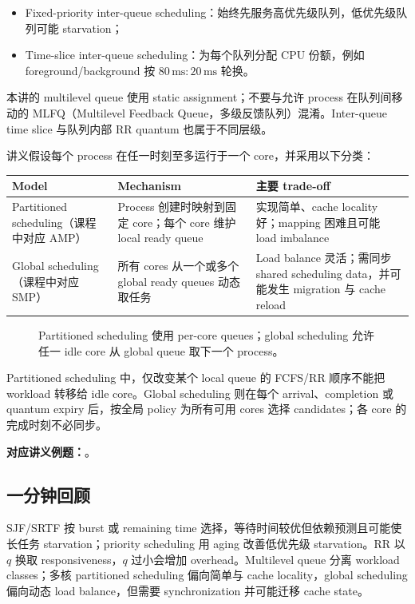 \begin{itemize}
  \item Fixed-priority inter-queue scheduling：始终先服务高优先级队列，低优先级队列可能 starvation；
  \item Time-slice inter-queue scheduling：为每个队列分配 CPU 份额，例如 foreground/background 按 $80\,\mathrm{ms}:20\,\mathrm{ms}$ 轮换。
\end{itemize}

本讲的 multilevel queue 使用 static assignment；不要与允许 process 在队列间移动的 MLFQ（Multilevel Feedback Queue，多级反馈队列）混淆。Inter-queue time slice 与队列内部 RR quantum 也属于不同层级。


讲义假设每个 process 在任一时刻至多运行于一个 core，并采用以下分类：

\begin{center}
\small
\begin{tabularx}{0.96\textwidth}{@{}>{\raggedright\arraybackslash}p{3.0cm}XX@{}}
  \toprule
  Model & Mechanism & 主要 trade-off \\
  \midrule
  Partitioned scheduling（课程中对应 AMP） & Process 创建时映射到固定 core；每个 core 维护 local ready queue & 实现简单、cache locality 好；mapping 困难且可能 load imbalance \\
  Global scheduling（课程中对应 SMP） & 所有 cores 从一个或多个 global ready queues 动态取任务 & Load balance 灵活；需同步 shared scheduling data，并可能发生 migration 与 cache reload \\
  \bottomrule
\end{tabularx}
\end{center}

\begin{figure}[htbp]
  \centering
  \resizebox{0.94\textwidth}{!}{}
  \caption{Partitioned scheduling 使用 per-core queues；global scheduling 允许任一 idle core 从 global queue 取下一个 process。}
  \label{fig:sc2005-l06-multicore-models}
\end{figure}

Partitioned scheduling 中，仅改变某个 local queue 的 FCFS/RR 顺序不能把 workload 转移给 idle core。Global scheduling 则在每个 arrival、completion 或 quantum expiry 后，按全局 policy 为所有可用 cores 选择 candidates；各 core 的完成时刻不必同步。

\textbf{对应讲义例题：}。

\subsection{一分钟回顾}

SJF/SRTF 按 burst 或 remaining time 选择，等待时间较优但依赖预测且可能使长任务 starvation；priority scheduling 用 aging 改善低优先级 starvation。RR 以 $q$ 换取 responsiveness，$q$ 过小会增加 overhead。Multilevel queue 分离 workload classes；多核 partitioned scheduling 偏向简单与 cache locality，global scheduling 偏向动态 load balance，但需要 synchronization 并可能迁移 cache state。
